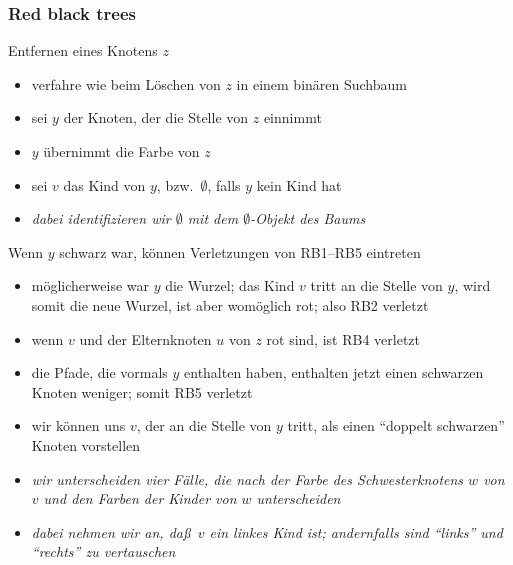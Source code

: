 \documentclass[aspectratio=1610, 11pt]{beamer}
\newcommand{\mytitle}{Red black trees}
\begin{document}
\begin{frame}\frametitle{\mytitle}
	\begin{overprint}
		\begin{exampleblock}{Entfernen eines Knotens $z$}
			\begin{itemize}
				\item verfahre wie beim L\"oschen von $z$ in einem bin\"aren Suchbaum
				\item sei $y$ der Knoten, der die Stelle von $z$ einnimmt
				\item $y$ \"ubernimmt die Farbe von $z$
				\item sei $v$ das Kind von $y$, bzw.\ $\emptyset$, falls $y$ kein Kind hat
				\item \itshape dabei identifizieren wir $\emptyset$ mit dem $\emptyset$-Objekt des Baums
			\end{itemize}
		\end{exampleblock}
		\begin{exampleblock}{Wenn $y$ schwarz war, k\"onnen Verletzungen von RB1--RB5 eintreten}
			\begin{itemize}
				\item m\"oglicherweise war $y$ die Wurzel; das Kind $v$ tritt an die Stelle von $y$, wird somit die neue Wurzel, ist aber wom\"oglich rot; also RB2 verletzt
				\item wenn $v$ und der Elternknoten $u$ von $z$ rot sind, ist RB4 verletzt
				\item die Pfade, die vormals $y$ enthalten haben, enthalten jetzt einen schwarzen Knoten weniger; somit RB5 verletzt
				\item wir k\"onnen uns $v$, der an die Stelle von $y$ tritt, als einen ``doppelt schwarzen'' Knoten vorstellen
				\item \itshape wir unterscheiden vier F\"alle, die nach der Farbe des Schwesterknotens $w$ von $v$ und den Farben der Kinder von $w$ unterscheiden
				\item \itshape dabei nehmen wir an, da\ss\ $v$ ein linkes Kind ist; andernfalls sind ``links'' und ``rechts'' zu vertauschen
			\end{itemize}
		\end{exampleblock}
	\end{overprint}
\end{frame}
\end{document}
